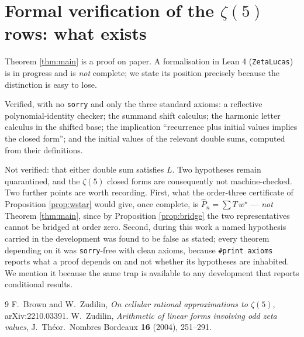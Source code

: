 \documentclass[11pt,a4paper]{amsart}
\theoremstyle{plain}
\theoremstyle{definition}
\theoremstyle{remark}
\newcommand{\T}{T}
\begin{document}
\section{Formal verification of the $\zeta(5)$ rows: what exists}\label{sec:formal}

Theorem \ref{thm:main} is a proof on paper. A formalisation in Lean 4 (\texttt{ZetaLucas}) is in
progress and is \emph{not} complete; we state its position precisely because the distinction is
easy to lose.

Verified, with no \texttt{sorry} and only the three standard axioms: a reflective
polynomial-identity checker; the summand shift calculus; the harmonic letter calculus in the
shifted base; the implication ``recurrence plus initial values implies the closed form''; and the
initial values of the relevant double sums, computed from their definitions.

Not verified: that either double sum satisfies $L$. Two hypotheses remain quarantined, and the
$\zeta(5)$ closed forms are consequently not machine-checked. Two further points are worth
recording. First, what the order-three certificate of Proposition \ref{prop:wstar} would give,
once complete, is $\widehat P_n=\sum\T\,w^\star$ --- \emph{not} Theorem \ref{thm:main}, since by
Proposition \ref{prop:bridge} the two representatives cannot be bridged at order zero. Second,
during this work a named hypothesis carried in the development was found to be false as stated;
every theorem depending on it was \texttt{sorry}-free with clean axioms, because
\texttt{\#print axioms} reports what a proof depends on and not whether its hypotheses are
inhabited. We mention it because the same trap is available to any development that reports
conditional results.

\begin{thebibliography}{9}
 F.~Brown and W.~Zudilin, \emph{On cellular rational approximations to $\zeta(5)$},
arXiv:2210.03391.
 W.~Zudilin, \emph{Arithmetic of linear forms involving odd zeta values},
J.~Th\'eor.\ Nombres Bordeaux \textbf{16} (2004), 251--291.
\end{thebibliography}
\end{document}
